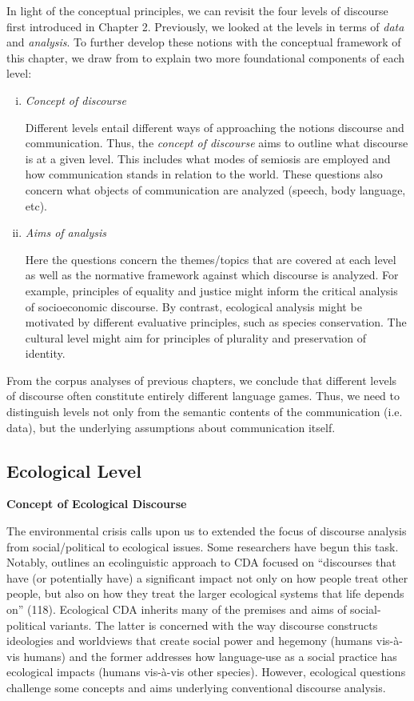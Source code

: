 In light of the conceptual principles, we can revisit the four levels of discourse first introduced in Chapter 2. Previously, we looked at the levels in terms of \textit{data} and \textit{analysis}. To further develop these notions with the conceptual framework of this chapter, we draw from \cite*{Blommaert2005a} to explain two more foundational components of each level:   

\begin{enumerate}[i.]
  \item \textit{Concept of discourse} 

Different levels entail different ways of approaching the notions discourse and communication. Thus, the \textit{concept of discourse} aims to outline what discourse is at a given level. This includes what modes of semiosis are employed and how communication stands in relation to the world. These questions also concern what objects of communication are analyzed (speech, body language, etc).

  \item \textit{Aims of analysis} 
  
Here the questions concern the themes/topics that are covered at each level as well as the normative framework against which discourse is analyzed. For example, principles of equality and justice might inform the critical analysis of socioeconomic discourse. By contrast, ecological analysis might be motivated by different evaluative principles, such as species conservation. The cultural level might aim for principles of plurality and preservation of identity.     
\end{enumerate}

From the corpus analyses of previous chapters, we conclude that different levels of discourse often constitute entirely different language games. Thus, we need to distinguish levels not only from the semantic contents of the communication (i.e. data), but the underlying assumptions about communication itself.
 
\subsection{Ecological Level}

\textbf{Concept of Ecological Discourse}

The environmental crisis calls upon us to extended the focus of discourse analysis from social/political to ecological issues. Some researchers have begun this task. Notably, \cite*{Stibbe2014b} outlines an ecolinguistic approach to CDA focused on ``discourses that have (or potentially have) a significant impact not only on how people treat other people, but also on how they treat the larger ecological systems that life depends on'' (118). Ecological CDA inherits many of the premises and aims of social-political variants. The latter is concerned with the way discourse constructs ideologies and worldviews that create social power and hegemony (humans vis-\`a-vis humans) and the former addresses how language-use as a social practice has ecological impacts (humans vis-\`a-vis other species). However, ecological questions challenge some concepts and aims underlying conventional discourse analysis.

